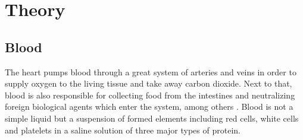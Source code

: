 \section{Theory}
\subsection{Blood}
\label{bloodtheory}
The heart pumps blood through a great system of arteries and veins in order to supply oxygen to the living tissue and take away carbon dioxide. Next to that, blood is also responsible for collecting food from the intestines and neutralizing foreign biological agents which enter the system, among others \cite{rheologyofblood}. Blood is not a simple liquid but a suspension of formed elements including red cells, white cells and platelets in a saline solution of three major types of protein. 

